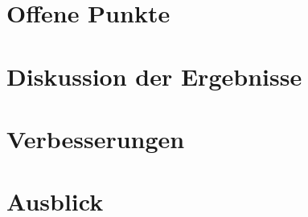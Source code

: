 
\section{Offene Punkte}
\section{Diskussion der Ergebnisse}
\lipsum[1-3]
\section{Verbesserungen}
\section{Ausblick}